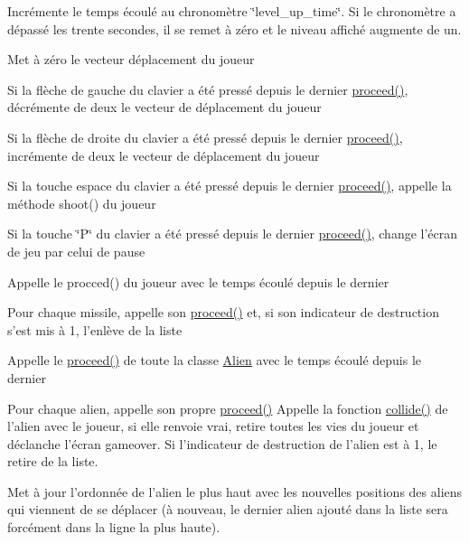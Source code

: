 Incrémente le temps écoulé au chronomètre \char`\"{}level\-\_\-up\-\_\-time\char`\"{}. Si le chronomètre a dépassé les trente secondes, il se remet à zéro et le niveau affiché augmente de un.


\begin{DoxyItemize}
\item Met à zéro le vecteur déplacement du joueur
\item Si la flèche de gauche du clavier a été pressé depuis le dernier \hyperlink{class_motor_a5333ff4fde112f55953849964f8ae7fa}{proceed()}, décrémente de deux le vecteur de déplacement du joueur
\item Si la flèche de droite du clavier a été pressé depuis le dernier \hyperlink{class_motor_a5333ff4fde112f55953849964f8ae7fa}{proceed()}, incrémente de deux le vecteur de déplacement du joueur
\item Si la touche espace du clavier a été pressé depuis le dernier \hyperlink{class_motor_a5333ff4fde112f55953849964f8ae7fa}{proceed()}, appelle la méthode shoot() du joueur
\item Si la touche \char`\"{}\-P\char`\"{} du clavier a été pressé depuis le dernier \hyperlink{class_motor_a5333ff4fde112f55953849964f8ae7fa}{proceed()}, change l'écran de jeu par celui de pause
\end{DoxyItemize}

Appelle le procced() du joueur avec le temps écoulé depuis le dernier

Pour chaque missile, appelle son \hyperlink{class_motor_a5333ff4fde112f55953849964f8ae7fa}{proceed()} et, si son indicateur de destruction s'est mis à 1, l'enlève de la liste

Appelle le \hyperlink{class_motor_a5333ff4fde112f55953849964f8ae7fa}{proceed()} de toute la classe \hyperlink{class_alien}{Alien} avec le temps écoulé depuis le dernier

Pour chaque alien, appelle son propre \hyperlink{class_motor_a5333ff4fde112f55953849964f8ae7fa}{proceed()} Appelle la fonction \hyperlink{class_motor_a810690068c5edddd73d584e0dd19acd4}{collide()} de l'alien avec le joueur, si elle renvoie vrai, retire toutes les vies du joueur et déclanche l'écran gameover. Si l'indicateur de destruction de l'alien est à 1, le retire de la liste.


\begin{DoxyItemize}
\item Met à jour l'ordonnée de l'alien le plus haut avec les nouvelles positions des aliens qui viennent de se déplacer (à nouveau, le dernier alien ajouté dans la liste sera forcément dans la ligne la plus haute).
\end{DoxyItemize}


